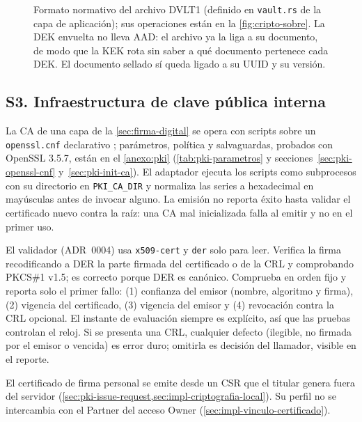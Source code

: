 \begin{figure}[!tb]
  \centering
  
  \caption{Formato normativo del archivo DVLT1 (definido en \texttt{vault.rs} de la capa de aplicación); sus operaciones están en la \cref{fig:cripto-sobre}. La DEK envuelta no lleva AAD: el archivo ya la liga a su documento, de modo que la KEK rota sin saber a qué documento pertenece cada DEK. El documento sellado sí queda ligado a su UUID y su versión.}
  \label{fig:impl-vault}\label{tab:impl-vault}
\end{figure}

\subsection{S3. Infraestructura de clave pública interna}\label{sec:impl-s3-pki}

La CA de una capa de la \cref{sec:firma-digital} se opera con scripts sobre un \texttt{openssl.cnf} declarativo \cite{cooper2008}; parámetros, política y salvaguardas, probados con OpenSSL 3.5.7, están en el \cref{anexo:pki} (\cref{tab:pki-parametros} y secciones~\ref{sec:pki-openssl-cnf} y~\ref{sec:pki-init-ca}). El adaptador ejecuta los scripts como subprocesos con su directorio en \texttt{PKI\_CA\_DIR} y normaliza las series a hexadecimal en mayúsculas antes de invocar alguno. La emisión no reporta éxito hasta validar el certificado nuevo contra la raíz: una CA mal inicializada falla al emitir y no en el primer uso.

El validador (ADR~0004) usa \texttt{x509-cert} y \texttt{der} solo para leer. Verifica la firma recodificando a DER la parte firmada del certificado o de la CRL y comprobando PKCS\#1 v1.5; es correcto porque DER es canónico. Comprueba en orden fijo y reporta solo el primer fallo: (1) confianza del emisor (nombre, algoritmo y firma), (2) vigencia del certificado, (3) vigencia del emisor y (4) revocación contra la CRL opcional. El instante de evaluación siempre es explícito, así que las pruebas controlan el reloj. Si se presenta una CRL, cualquier defecto (ilegible, no firmada por el emisor o vencida) es error duro; omitirla es decisión del llamador, visible en el reporte.

El certificado de firma personal se emite desde un CSR que el titular genera fuera del servidor (\cref{sec:pki-issue-request,sec:impl-criptografia-local}). Su perfil no se intercambia con el Partner del acceso Owner (\cref{sec:impl-vinculo-certificado}).



